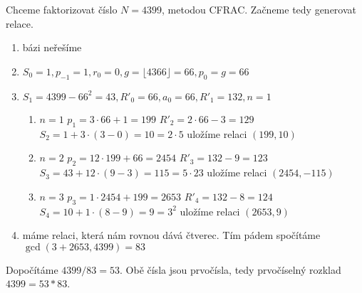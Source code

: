 \documentclass[12pt, a4paper]{article}
\begin{document}
Chceme faktorizovat číslo $N=4399$, metodou CFRAC. Začneme tedy generovat relace.
\begin{enumerate}
\item bázi neřešíme
\item $S_0 = 1, p_{-1}=1, r_0 = 0, g = \lfloor 4366 \rfloor = 66, p_0 = g = 66$
\item $S_1 = 4399 - 66^2 = 43, R'_0 = 66, a_0 = 66, R'_1 = 132, n=1$
\begin{enumerate}
\item $n = 1$
\subitem $p_1 = 3 \cdot 66 + 1 = 199$
\subitem $R'_2 = 2\cdot 66 - 3 = 129$
\subitem $S_2 = 1 + 3\cdot(3-0) = 10 = 2 \cdot 5$
\subitem uložíme relaci $(199, 10)$
\item $n = 2$
\subitem $p_2 = 12 \cdot 199 + 66 = 2454$
\subitem $R'_3 = 132 - 9 = 123$
\subitem $S_3 = 43 + 12\cdot(9-3) = 115 = 5 \cdot 23$
\subitem uložíme relaci $(2454, -115)$
\item $n = 3$
\subitem $p_3 = 1 \cdot 2454 + 199 = 2653$
\subitem $R'_4 = 132 - 8 = 124$
\subitem $S_4 = 10 + 1\cdot(8-9) = 9 = 3^2$
\subitem uložíme relaci $(2653, 9)$
\end{enumerate}
\item máme relaci, která nám rovnou dává čtverec. Tím pádem spočítáme $\gcd(3+2653,4399)=83$
\end{enumerate}
Dopočítáme $4399/83 = 53$. Obě čísla jsou prvočísla, tedy prvočíselný rozklad $4399 = 53 * 83$.
\end{document}
